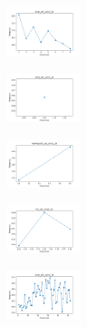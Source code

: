 \begin{figure}[H]
\begin{subfigure}
    \end{subfigure}
    \hfill
    \begin{subfigure}
        \centering
        \includegraphics[width=0.234\textwidth]{img/copkm/ecoli_set_const_10_589741062_time.png}
    \end{subfigure}
    \hfill
    \begin{subfigure}
        \centering
        \includegraphics[width=0.234\textwidth]{img/copkm/rand_set_const_10_589741062_time.png}
    \end{subfigure}
    \hfill
    \begin{subfigure}
        \centering
        \includegraphics[width=0.234\textwidth]{img/copkm/newthyroid_set_const_10_589741062_time.png}
    \end{subfigure}
    \hfill
    \begin{subfigure}
        \centering
        \includegraphics[width=0.234\textwidth]{img/copkm/iris_set_const_10_277451237_time.png}
    \end{subfigure}
    \hfill
    \begin{subfigure}
        \centering
        \includegraphics[width=0.234\textwidth]{img/copkm/ecoli_set_const_10_277451237_time.png}
    \end{subfigure}
    \hfill

\end{figure}
